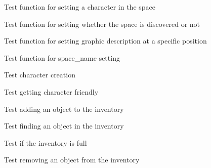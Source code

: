 \begin{DoxyRefList}
%
Test function for setting a character in the space  
\item[Global \doxylink{space__test_8c_a997b53a481b02485dd54c9cbce83465a}{test2\+\_\+space\+\_\+set\+\_\+discovered} ()]\label{test__test000190}%
%
Test function for setting whether the space is discovered or not  
\item[Global \doxylink{space__test_8c_a4a32a571bad0e29d1dff0bde88785b78}{test2\+\_\+space\+\_\+set\+\_\+gdesc\+\_\+at} ()]\label{test__test000198}%
%
Test function for setting graphic description at a specific position  
\item[Global \doxylink{space__test_8c_a5a868ba017602ba6b58447cb394e81a6}{test2\+\_\+space\+\_\+set\+\_\+name} ()]\label{test__test000187}%
%
Test function for space\+\_\+name setting  
\item[Global \doxylink{character__test_8c_a9fdc05e72bd410cf54834d8b8195e681}{test3\+\_\+character\+\_\+create} ()]\label{test__test000003}%
%
Test character creation  
\item[Global \doxylink{character__test_8c_abe7b660d3a3bc489b7c31f7c59918b69}{test3\+\_\+character\+\_\+get\+\_\+friendly} ()]\label{test__test000023}%
%
Test getting character friendly  
\item[Global \doxylink{inventory__test_8c_a77405dc2e23bc5e07f88194ade40a454}{test3\+\_\+inventory\+\_\+add\+\_\+object} ()]\label{test__test000072}%
%
Test adding an object to the inventory  
\item[Global \doxylink{inventory__test_8c_aa88b752e850cb5cce20d57e59e468f7e}{test3\+\_\+inventory\+\_\+find\+\_\+object} ()]\label{test__test000086}%
%
Test finding an object in the inventory  
\item[Global \doxylink{inventory__test_8c_a540dbcbfd29bd63590d081e496f8227f}{test3\+\_\+inventory\+\_\+is\+\_\+full} ()]\label{test__test000089}%
%
Test if the inventory is full  
\item[Global \doxylink{inventory__test_8c_a2e3416a88f9c36ab13de940634c845b6}{test3\+\_\+inventory\+\_\+remove\+\_\+object} ()]\label{test__test000075}%
%
Test removing an object from the inventory  
\item[Global \doxylink{set__test_8c_af71fed6f79d687763c7b623affd98f8e}{test3\+\_\+set\+\_\+add} ()]\label{test__test000172}%

\end{DoxyRefList}

